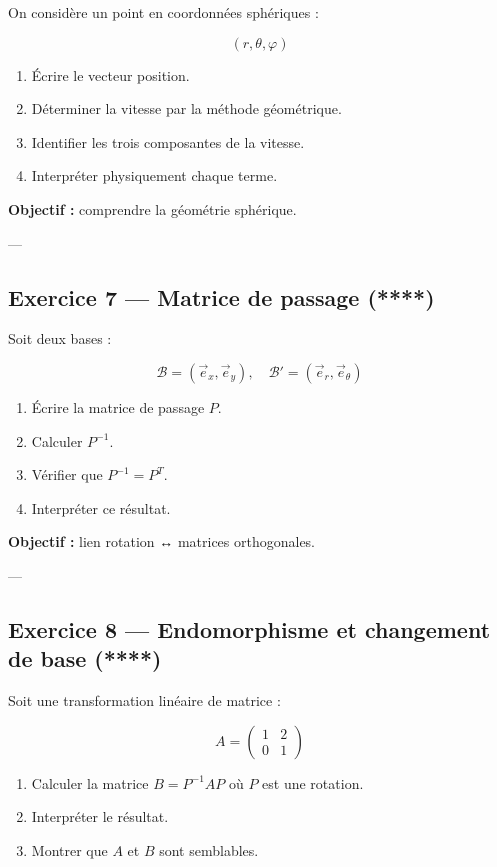 \documentclass[11pt,a4paper]{article}
\begin{document}
On considère un point en coordonnées sphériques :

\[
(r,\theta,\varphi)
\]

\begin{enumerate}
\item Écrire le vecteur position.
\item Déterminer la vitesse par la méthode géométrique.
\item Identifier les trois composantes de la vitesse.
\item Interpréter physiquement chaque terme.
\end{enumerate}

\textbf{Objectif :} comprendre la géométrie sphérique.

---

\subsection*{Exercice 7 — Matrice de passage (****)}

Soit deux bases :

\[
\mathcal{B} = (\vec{e}_x,\vec{e}_y), \quad
\mathcal{B}' = (\vec{e}_r,\vec{e}_\theta)
\]

\begin{enumerate}
\item Écrire la matrice de passage $P$.
\item Calculer $P^{-1}$.
\item Vérifier que $P^{-1} = P^T$.
\item Interpréter ce résultat.
\end{enumerate}

\textbf{Objectif :} lien rotation ↔ matrices orthogonales.

---

\subsection*{Exercice 8 — Endomorphisme et changement de base (****)}

Soit une transformation linéaire de matrice :

\[
A =
\begin{pmatrix}
1 & 2 \\
0 & 1
\end{pmatrix}
\]

\begin{enumerate}
\item Calculer la matrice $B = P^{-1}AP$ où $P$ est une rotation.
\item Interpréter le résultat.
\item Montrer que $A$ et $B$ sont semblables.
\end{enumerate}
\end{document}
